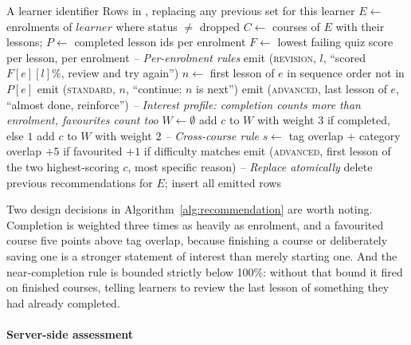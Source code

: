 \documentclass[12pt, oneside]{article} %
\newcommand{\tcode}[1]{\path{#1}}
\begin{document}
\begin{algorithm}[H]
\caption{generateRecommendations($learner$)}
\label{alg:recommendation}
\begin{algorithmic}[1]
\Require A learner identifier
\Ensure Rows in \tcode{recommendations}, replacing any previous set for this learner
\State $E \gets$ enrolments of $learner$ where status $\neq$ dropped
 \State \Return \EndIf
\State $C \gets$ courses of $E$ with their lessons; $P \gets$ completed lesson ids per enrolment
\State $F \gets$ lowest failing quiz score per lesson, per enrolment
\Statex \textit{-- Per-enrolment rules}
    \State emit (\textsc{revision}, $l$, ``scored $F[e][l]$\%, review and try again'')
  \EndFor
  \State $n \gets$ first lesson of $e$ in sequence order not in $P[e]$
    \State emit (\textsc{standard}, $n$, ``continue: $n$ is next'')
  \EndIf
    \State emit (\textsc{advanced}, last lesson of $e$, ``almost done, reinforce'')
  \EndIf
\EndFor
\Statex \textit{-- Interest profile: completion counts more than enrolment, favourites count too}
\State $W \gets \emptyset$ 
 \State add $c$ to $W$ with weight $3$ if completed, else $1$ \EndFor
{} \State add $c$ to $W$ with weight $2$ \EndFor
\Statex \textit{-- Cross-course rule}
  \State $s \gets$ tag overlap $+$ category overlap $+ 5$ if favourited $+ 1$ if difficulty matches
\EndFor
\State emit (\textsc{advanced}, first lesson of the two highest-scoring $c$, most specific reason)
\Statex \textit{-- Replace atomically}
\State delete previous recommendations for $E$; insert all emitted rows
\end{algorithmic}
\end{algorithm}

Two design decisions in Algorithm~\ref{alg:recommendation} are worth noting. Completion is weighted three times as heavily as enrolment, and a favourited course five points above tag overlap, because finishing a course or deliberately saving one is a stronger statement of interest than merely starting one. And the near-completion rule is bounded strictly below 100\%: without that bound it fired on finished courses, telling learners to review the last lesson of something they had already completed.

\paragraph{Server-side assessment}
\end{document}
